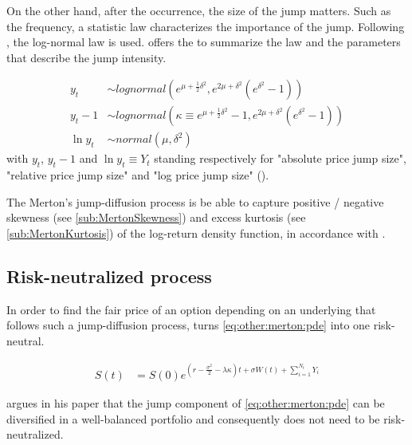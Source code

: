\documentclass[12pt,a4paper]{report}
\newcommand{\Bm}{W\left(t\right)}
\newcommand{\St}{S\left(t\right)}
\begin{document}
On the other hand, after the occurrence, the size of the jump matters. Such as the frequency, a statistic law characterizes the importance of the jump. Following \citet{merton76}, the log-normal law is used. \citet{matsuda2004} offers the  to summarize the law and the parameters that describe the jump intensity.
 
\begin{align}
  y_t  &\sim lognormal( e^{\mu + \frac{1}{2} \delta^2}, 
                        e^{2 \mu + \delta ^2} (e^{\delta^2} - 1)) 
  \label{eq:yt} \\
  y_t - 1 &\sim lognormal( \kappa \equiv e^{\mu + \frac{1}{2} \delta^2} - 1, 
                        e^{2 \mu + \delta ^2} (e^{\delta^2} - 1)) 
  \label{eq:ytminus1} \\
  \ln{y_t} &\sim normal(\mu, \delta^ 2)
  \label{eq:lny}
\end{align}
with $y_t$, $y_t - 1$ and $\ln{y_t} \equiv Y_t$ standing respectively for "absolute price jump size", "relative price jump size" and "log price jump size" (\citet{matsuda2004}).

 
The Merton's jump-diffusion process is be able to capture positive / negative skewness (see \cref{sub:MertonSkewness}) and excess kurtosis (see \cref{sub:MertonKurtosis}) of the log-return density function, in accordance with \citet{merton76}. 


\subsection{Risk-neutralized process}
\label{sub:other:merton:risk}

In order to find the fair price of an option depending on an underlying that follows such a jump-diffusion process, \citet{merton76} turns \cref{eq:other:merton:pde} into one risk-neutral.

\begin{align}
  \St &= S\left(0\right) e^{\left(r - \frac{\sigma^2}{2} - \lambda \kappa\right) t + \sigma \Bm + \sum_{i=1}^{N_t} Y_i}
  \label{eq:other:merton:pde:riskneutral}
\end{align}

\citet{merton76} argues in his paper that the jump component of \cref{eq:other:merton:pde} can be diversified in a well-balanced portfolio and consequently does not need to be risk-neutralized.
\end{document}
